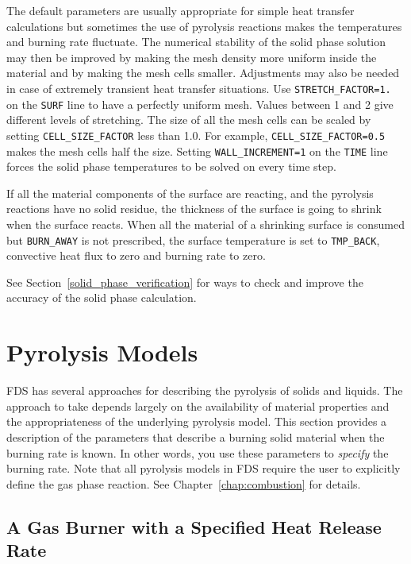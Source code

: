 \documentclass[11pt]{book}
\newcommand{\ct}{\tt\small}
\begin{document}
The default parameters are usually appropriate for simple heat
transfer calculations but sometimes the use of pyrolysis reactions
makes the temperatures and burning rate fluctuate. The numerical
stability of the solid phase solution may then be improved by making
the mesh density more uniform inside the material and by making the
mesh cells smaller. Adjustments may also be needed in case of
extremely transient heat transfer situations. Use {\ct STRETCH\_FACTOR=1.}
on the {\ct SURF} line to have a perfectly uniform mesh. Values
between 1 and 2 give different levels of stretching.  The size of
all the mesh cells can be scaled by setting {\ct CELL\_SIZE\_FACTOR}
less than 1.0. For example, {\ct CELL\_SIZE\_FACTOR=0.5} makes the
mesh cells half the size. Setting {\ct WALL\_INCREMENT=1} on the
{\ct TIME} line forces the solid phase temperatures to be solved on every
time step.

If all the material components of the surface are reacting, and the pyrolysis reactions have no solid residue, the thickness of
the surface is going to shrink when the surface reacts. When all the material of
a shrinking surface is consumed but {\ct BURN\_AWAY} is not prescribed, the surface temperature is
set to {\ct TMP\_BACK}, convective heat flux
to zero and burning rate to zero.

See Section~\ref{solid_phase_verification} for ways to check and improve the accuracy of the solid phase calculation.


\clearpage

\section{Pyrolysis Models}

FDS has several approaches for describing the pyrolysis of solids and liquids. The approach to take depends largely
on the availability of material properties and the appropriateness of the underlying pyrolysis model. This
section provides a description of the parameters that describe a burning solid material when the burning rate is known. In other
words, you use these parameters to {\em specify} the burning rate.
Note that all pyrolysis models in FDS require the user to explicitly define the gas phase reaction. See Chapter~\ref{chap:combustion} for details.

\subsection{A Gas Burner with a Specified Heat Release Rate}
\end{document}
